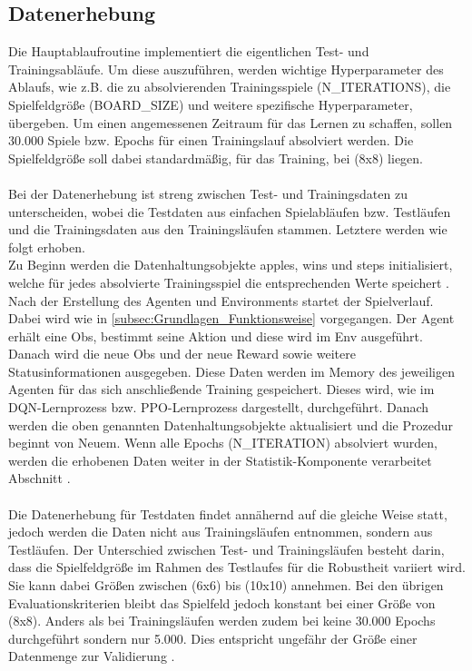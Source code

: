 \subsection{Datenerhebung} \label{subsec:Konzept_Datenerhebung}
Die Hauptablaufroutine implementiert die eigentlichen Test- und Trainingsabläufe.
Um diese auszuführen, werden wichtige Hyperparameter des Ablaufs, wie z.B. die zu absolvierenden Trainingsspiele (N\_ITERATIONS), die Spielfeldgröße (BOARD\_SIZE) und weitere spezifische Hyperparameter, übergeben. Um einen angemessenen Zeitraum für das Lernen zu schaffen, sollen 30.000 Spiele bzw. Epochs für einen Trainingslauf absolviert werden. Die Spielfeldgröße soll dabei standardmäßig, für das Training, bei (8x8) liegen.\\
\\Bei der Datenerhebung ist streng zwischen Test- und Trainingsdaten zu unterscheiden, wobei die Testdaten aus einfachen Spielabläufen bzw. Testläufen und die Trainingsdaten aus den Trainingsläufen stammen. Letztere werden wie folgt erhoben.\\
Zu Beginn werden die Datenhaltungsobjekte apples, wins und steps initialisiert, welche für jedes absolvierte Trainingsspiel die entsprechenden Werte speichert . 
Nach der Erstellung des Agenten und Environments startet der Spielverlauf.\\
Dabei wird wie in \autoref{subsec:Grundlagen_Funktionsweise} vorgegangen. Der Agent erhält eine Obs, bestimmt seine Aktion und diese wird im Env ausgeführt. Danach wird die neue Obs und der neue Reward sowie weitere Statusinformationen ausgegeben. Diese Daten werden im Memory des jeweiligen Agenten für das sich anschließende Training gespeichert. Dieses wird, wie im DQN-Lernprozess  bzw. PPO-Lernprozess  dargestellt, durchgeführt. 
Danach werden die oben genannten Datenhaltungsobjekte aktualisiert und die Prozedur beginnt von Neuem. Wenn alle Epochs (N\_ITERATION) absolviert wurden, werden die erhobenen Daten weiter in der Statistik-Komponente verarbeitet Abschnitt .\\
\\Die Datenerhebung für Testdaten findet annähernd auf die gleiche Weise statt, jedoch werden die Daten nicht aus Trainingsläufen entnommen, sondern aus Testläufen. Der Unterschied zwischen Test- und Trainingsläufen besteht darin, dass die Spielfeldgröße im Rahmen des Testlaufes für die Robustheit variiert wird. Sie kann dabei Größen zwischen (6x6) bis (10x10) annehmen. Bei den übrigen Evaluationskriterien bleibt das Spielfeld jedoch konstant bei einer Größe von (8x8). Anders als bei Trainingsläufen werden zudem bei keine 30.000 Epochs durchgeführt sondern nur 5.000. Dies entspricht ungefähr der Größe einer Datenmenge zur Validierung \cite[S. 134]{DL}.\\
